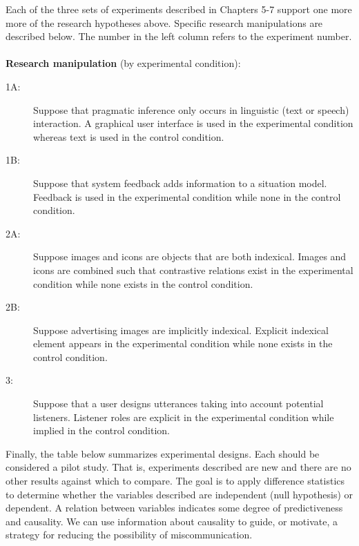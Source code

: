 Each of the three sets of experiments described in Chapters 5-7 support one more more of the research hypotheses above. Specific research manipulations  are described below. The number in the left column refers to the experiment number.
\\
\\
\textbf{Research manipulation} (by experimental condition):
\begin{description}
\item[1A:]  \hspace{6pt}Suppose that pragmatic inference only occurs in linguistic (text or speech) interaction. A graphical user interface is used in the experimental condition whereas text is used in the control condition.
\item[1B:]  \hspace{6pt}Suppose that system feedback adds information to a situation model. Feedback is used in the experimental condition while none in the control condition.
\item[2A:]  \hspace{6pt}Suppose images and icons are objects that are both indexical. Images and icons are combined such that contrastive relations exist in the experimental condition while none exists in the control condition.
\item[2B:]  \hspace{6pt}Suppose advertising images are implicitly indexical. Explicit indexical element appears in the experimental condition while none exists in the control condition. 
\item[3:]  \hspace{12pt}Suppose that a user designs utterances taking into account potential listeners. Listener roles are explicit in the experimental condition while implied in the control condition.
\end{description}

Finally, the table below summarizes experimental designs. Each should be considered a pilot study. That is, experiments described are new and there are no other results against which to compare. The goal is to apply difference statistics to determine whether the variables described are independent (null hypothesis) or dependent. A relation between variables indicates some degree of predictiveness and causality. We can use information about causality to guide, or motivate, a strategy for reducing the possibility of miscommunication.



